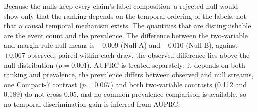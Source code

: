 \documentclass[11pt]{article}
\newcommand{\compact}{Compact-7\xspace}
\begin{document}
Because the nulls keep every claim's label composition, a rejected null would show only that the
ranking depends on the temporal ordering of the labels, not that a causal temporal mechanism
exists. The quantities that are distinguishable are the event count and the prevalence. The difference
between the two-variable and margin-rule null means is $-0.009$ (Null A) and $-0.010$ (Null B),
against $+0.067$ observed; paired within each draw, the observed difference lies above the null distribution
($p=0.001$). AUPRC is treated separately: it depends on both ranking and prevalence,
the prevalence differs between observed and null streams, one \compact contrast ($p=0.067$) and
both two-variable contrasts (0.112 and 0.189) do not cross 0.05, and no common-prevalence
comparison is available, so no temporal-discrimination gain is inferred from AUPRC.
\end{document}
